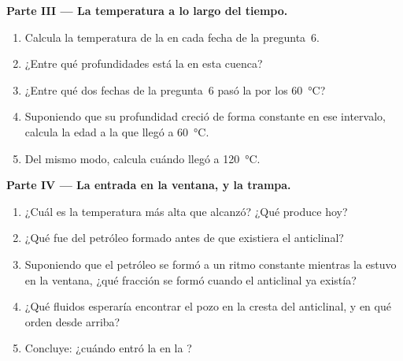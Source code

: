 \begin{problem}
\medskip
\noindent\textbf{Parte III --- La temperatura a lo largo del tiempo.}
\begin{enumerate}[resume]
  \item Calcula la temperatura de la  en cada fecha de la
        pregunta~6.
  \item ¿Entre qué profundidades está la  en esta cuenca?
  \item ¿Entre qué dos fechas de la pregunta~6 pasó la  por los
        \qty{60}{\degreeCelsius}?
  \item Suponiendo que su profundidad creció de forma constante en ese
        intervalo, calcula la edad a la que llegó a \qty{60}{\degreeCelsius}.
  \item Del mismo modo, calcula cuándo llegó a \qty{120}{\degreeCelsius}.
\end{enumerate}

\medskip
\noindent\textbf{Parte IV --- La entrada en la ventana, y la trampa.}
\begin{enumerate}[resume]
  \item ¿Cuál es la temperatura más alta que alcanzó? ¿Qué produce hoy?
  \item ¿Qué fue del petróleo formado antes de que existiera el anticlinal?
  \item Suponiendo que el petróleo se formó a un ritmo constante mientras la
         estuvo en la ventana, ¿qué fracción se formó cuando el
        anticlinal ya existía?
  \item ¿Qué fluidos esperaría encontrar el pozo en la cresta del anticlinal, y
        en qué orden desde arriba?
  \item Concluye: ¿cuándo entró la  en la ?
\end{enumerate}
\end{problem}
